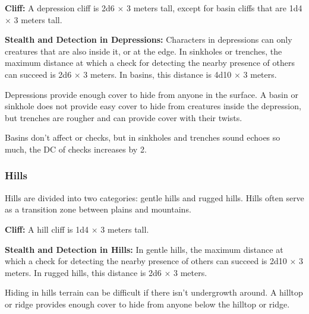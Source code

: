 \textbf{Cliff:} A depression cliff is 2d6 $\times$ 3 meters tall, except for basin cliffs that are 1d4 $\times$ 3 meters tall.

\textbf{Stealth and Detection in Depressions:} Characters in depressions can only  creatures that are also inside it, or at the edge. In sinkholes or trenches, the maximum distance at which a  check for detecting the nearby presence of others can succeed is 2d6 $\times$ 3 meters. In basins, this distance is 4d10 $\times$ 3 meters.

Depressions provide enough cover to hide from anyone in the surface. A basin or sinkhole does not provide easy cover to hide from creatures inside the depression, but trenches are rougher and can provide cover with their twists.

Basins don't affect  or  checks, but in sinkholes and trenches sound echoes so much, the DC of  checks increases by 2.

\subsubsection{Hills}
Hills are divided into two categories: gentle hills and rugged hills. Hills  often serve as a transition zone between plains and mountains.


\textbf{Cliff:} A hill cliff is 1d4 $\times$ 3 meters tall.

\textbf{Stealth and Detection in Hills:} In gentle hills, the maximum distance at which a  check for detecting the nearby presence of others can succeed is 2d10 $\times$ 3 meters. In rugged hills, this distance is 2d6 $\times$ 3 meters.

Hiding in hills terrain can be difficult if there isn't undergrowth around. A hilltop or ridge provides enough cover to hide from anyone below the hilltop or ridge.

